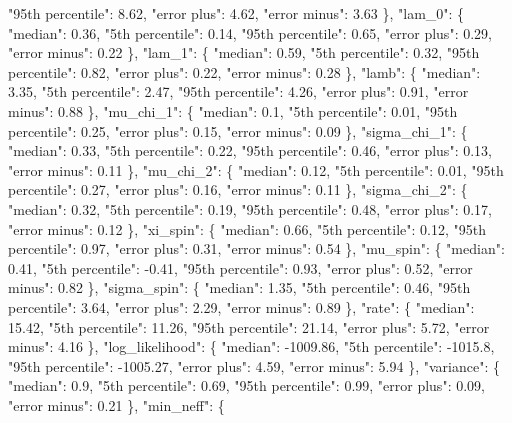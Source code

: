 {{        "95th percentile": 8.62, %
        "error plus": 4.62, %
        "error minus": 3.63%
      \}, %
      "lam\_0": \{%
        "median": 0.36, %
        "5th percentile": 0.14, %
        "95th percentile": 0.65, %
        "error plus": 0.29, %
        "error minus": 0.22%
      \}, %
      "lam\_1": \{%
        "median": 0.59, %
        "5th percentile": 0.32, %
        "95th percentile": 0.82, %
        "error plus": 0.22, %
        "error minus": 0.28%
      \}, %
      "lamb": \{%
        "median": 3.35, %
        "5th percentile": 2.47, %
        "95th percentile": 4.26, %
        "error plus": 0.91, %
        "error minus": 0.88%
      \}, %
      "mu\_chi\_1": \{%
        "median": 0.1, %
        "5th percentile": 0.01, %
        "95th percentile": 0.25, %
        "error plus": 0.15, %
        "error minus": 0.09%
      \}, %
      "sigma\_chi\_1": \{%
        "median": 0.33, %
        "5th percentile": 0.22, %
        "95th percentile": 0.46, %
        "error plus": 0.13, %
        "error minus": 0.11%
      \}, %
      "mu\_chi\_2": \{%
        "median": 0.12, %
        "5th percentile": 0.01, %
        "95th percentile": 0.27, %
        "error plus": 0.16, %
        "error minus": 0.11%
      \}, %
      "sigma\_chi\_2": \{%
        "median": 0.32, %
        "5th percentile": 0.19, %
        "95th percentile": 0.48, %
        "error plus": 0.17, %
        "error minus": 0.12%
      \}, %
      "xi\_spin": \{%
        "median": 0.66, %
        "5th percentile": 0.12, %
        "95th percentile": 0.97, %
        "error plus": 0.31, %
        "error minus": 0.54%
      \}, %
      "mu\_spin": \{%
        "median": 0.41, %
        "5th percentile": {-}0.41, %
        "95th percentile": 0.93, %
        "error plus": 0.52, %
        "error minus": 0.82%
      \}, %
      "sigma\_spin": \{%
        "median": 1.35, %
        "5th percentile": 0.46, %
        "95th percentile": 3.64, %
        "error plus": 2.29, %
        "error minus": 0.89%
      \}, %
      "rate": \{%
        "median": 15.42, %
        "5th percentile": 11.26, %
        "95th percentile": 21.14, %
        "error plus": 5.72, %
        "error minus": 4.16%
      \}, %
      "log\_likelihood": \{%
        "median": {-}1009.86, %
        "5th percentile": {-}1015.8, %
        "95th percentile": {-}1005.27, %
        "error plus": 4.59, %
        "error minus": 5.94%
      \}, %
      "variance": \{%
        "median": 0.9, %
        "5th percentile": 0.69, %
        "95th percentile": 0.99, %
        "error plus": 0.09, %
        "error minus": 0.21%
      \}, %
      "min\_neff": \{%
}}
